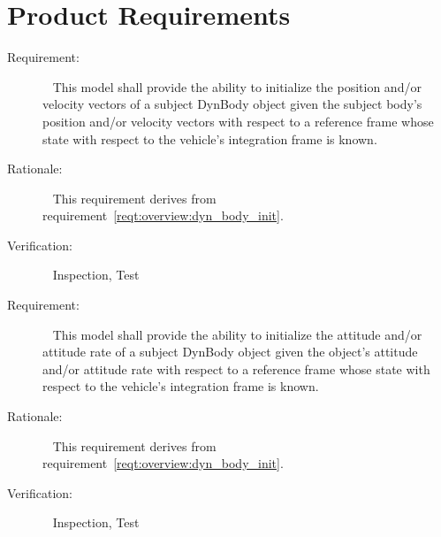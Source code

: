 %

\chapter{Product Requirements}\label{ch:\modelpartid:reqt}


\label{reqt:DynBodyInit:cartesian_trans}
\begin{description}
  \item[Requirement:]\ \newline
    This model shall provide the ability to initialize
    the position and/or velocity vectors of a subject DynBody object
    given the subject body's position and/or velocity vectors
    with respect to a reference frame
    whose state with respect to the vehicle's integration frame is known.
  \item[Rationale:]\ \newline
    This requirement derives from
    requirement~\ref{reqt:overview:dyn_body_init}.
  \item[Verification:]\ \newline
    Inspection, Test
\end{description}


\label{reqt:DynBodyInit:cartesian_rot}
\begin{description}
  \item[Requirement:]\ \newline
    This model shall provide the ability to initialize
    the attitude and/or attitude rate of a subject DynBody object
    given the object's attitude and/or attitude rate
    with respect to a reference frame
    whose state with respect to the vehicle's integration frame is known.
  \item[Rationale:]\ \newline
    This requirement derives from
    requirement~\ref{reqt:overview:dyn_body_init}.
  \item[Verification:]\ \newline
    Inspection, Test
\end{description}

